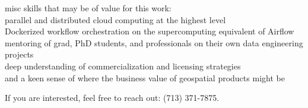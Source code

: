 \documentclass[letterpaper,10pt,colorlinks,linkcolor=cyan]{moderncv}
\begin{document}
misc skills that may be of value for this work:\\
\faHandPointRight[regular] parallel and distributed cloud computing at the highest level\\
\faHandPointRight[regular] Dockerized workflow orchestration on the supercomputing equivalent of Airflow\\
\faHandPointRight[regular] mentoring of grad, PhD students, and professionals on their own data engineering projects\\
\faHandPointRight[regular] deep understanding of commercialization and licensing strategies\\
\faHandPointRight[regular] and a keen sense of where the business value of geospatial products might be

If you are interested, feel free to reach out: (713) 371-7875.
\end{document}
